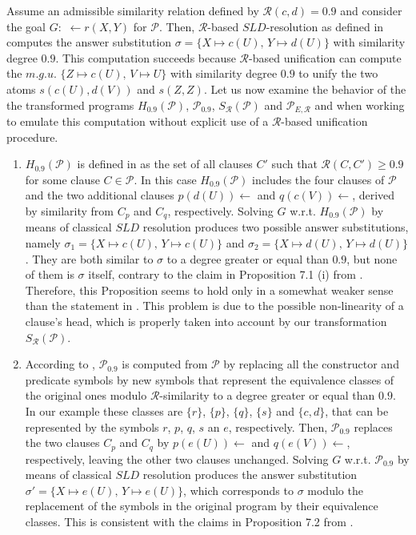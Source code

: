 \documentclass{sigplanconf}
\newcommand{\simrel}{\mathcal{R}}
\newcommand{\trans}[2]{S_{#1}(#2)}
\newcommand{\extended}[2]{H_{#1}(#2)} \newcommand{\abstracted}[2]{{#1}_{#2}}
\newcommand{\MAProg}{\mathcal{P}_{E, \simrel}}
\newcommand{\Prog}{\mathcal{P}} \newcommand{\UProg}{\mathcal{P_U}}
\theoremstyle{definition}
\theoremstyle{plain}
\begin{document}
Assume an admissible similarity relation defined by $\simrel(c,d) = 0.9$ and consider the goal $G:\,\, \gets r(X,Y)$ for $\Prog$. Then, $\simrel$-based $SLD$-resolution as defined in \cite{Ses02} computes the answer substitution $\sigma = \{X \mapsto c(U),\, Y \mapsto d(U)\}$ with similarity degree $0.9$. This computation succeeds because $\simrel$-based unification can compute the $m.g.u.$ $\{Z \mapsto c(U),\, V \mapsto U\}$ with similarity degree $0.9$ to unify the two atoms $s(c(U),d(V))$ and $s(Z,Z)$. Let us now examine the behavior of the the transformed programs $\extended{0.9}{\Prog}$, $\abstracted{\Prog}{0.9}$, $\trans{\simrel}{\Prog}$ and $\MAProg$ and when working to emulate this computation without  explicit use of a $\simrel$-based unification procedure.

\begin{enumerate}

    \item $\extended{0.9}{\Prog}$ is defined in \cite{Ses02} as the set of all clauses $C'$ such that $\simrel(C,C') \geq 0.9$ for some clause $C \in \Prog$. In this case $\extended{0.9}{\Prog}$ includes the four clauses of $\Prog$ and the two additional clauses $p(d(U)) \gets$ and $q(c(V)) \gets$, derived by similarity from $C_p$ and $C_q$, respectively. Solving $G$ w.r.t. $\extended{0.9}{\Prog}$ by means of classical $SLD$ resolution produces two possible answer substitutions, namely $\sigma_1 = \{X \mapsto c(U),\, Y \mapsto c(U)\}$ and $\sigma_2 = \{X \mapsto d(U),\, Y \mapsto d(U)\}$. They are both similar to $\sigma$ to a degree greater or equal than $0.9$, but none of them is $\sigma$ itself, contrary to the claim in Proposition 7.1 (i) from \cite{Ses02}. Therefore, this Proposition seems to hold only in a somewhat weaker sense than the statement in \cite{Ses02}. This problem is due to the possible non-linearity of a clause's head, which is properly taken into account by our transformation $\trans{\simrel}{\Prog}$.

    \item According to \cite{Ses02}, $\abstracted{\Prog}{0.9}$ is computed from $\Prog$ by replacing all the constructor and predicate symbols by new symbols that represent the equivalence classes of the original ones modulo $\simrel$-similarity to a degree greater or equal than $0.9$. In our example these classes are $\{r\}$, $\{p\}$, $\{q\}$, $\{s\}$ and $\{c,d\}$, that can be represented by the symbols $r$, $p$, $q$, $s$ an $e$, respectively. Then, $\abstracted{\Prog}{0.9}$ replaces the two clauses $C_p$ and $C_q$ by $p(e(U)) \gets$ and $q(e(V)) \gets$, respectively, leaving the other two clauses unchanged. Solving $G$ w.r.t. $\abstracted{\Prog}{0.9}$ by means of classical $SLD$ resolution produces the answer substitution $\sigma' = \{X \mapsto e(U),\, Y \mapsto e(U)\}$, which corresponds to $\sigma$ modulo the replacement of the symbols in the original program by their equivalence classes. This is consistent with the claims in Proposition 7.2 from \cite{Ses02}.


\end{enumerate}
\end{document}
